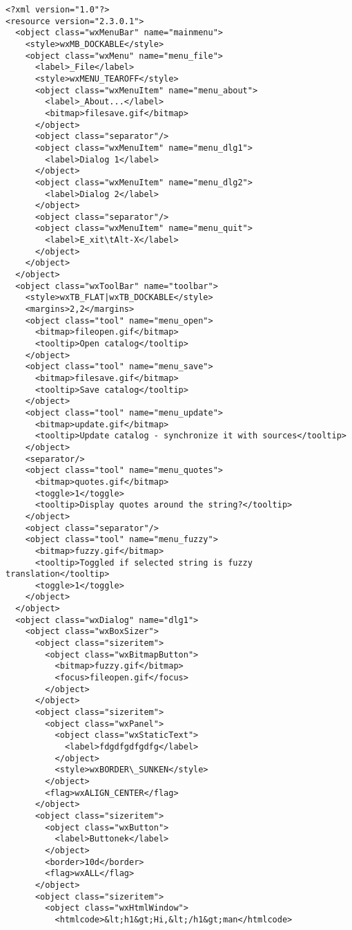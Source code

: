 \begin{verbatim}
<?xml version="1.0"?>
<resource version="2.3.0.1">
  <object class="wxMenuBar" name="mainmenu">
    <style>wxMB_DOCKABLE</style>
    <object class="wxMenu" name="menu_file">
      <label>_File</label>
      <style>wxMENU_TEAROFF</style>
      <object class="wxMenuItem" name="menu_about">
        <label>_About...</label>
        <bitmap>filesave.gif</bitmap>
      </object>
      <object class="separator"/>
      <object class="wxMenuItem" name="menu_dlg1">
        <label>Dialog 1</label>
      </object>
      <object class="wxMenuItem" name="menu_dlg2">
        <label>Dialog 2</label>
      </object>
      <object class="separator"/>
      <object class="wxMenuItem" name="menu_quit">
        <label>E_xit\tAlt-X</label>
      </object>
    </object>
  </object>
  <object class="wxToolBar" name="toolbar">
    <style>wxTB_FLAT|wxTB_DOCKABLE</style>
    <margins>2,2</margins>
    <object class="tool" name="menu_open">
      <bitmap>fileopen.gif</bitmap>
      <tooltip>Open catalog</tooltip>
    </object>
    <object class="tool" name="menu_save">
      <bitmap>filesave.gif</bitmap>
      <tooltip>Save catalog</tooltip>
    </object>
    <object class="tool" name="menu_update">
      <bitmap>update.gif</bitmap>
      <tooltip>Update catalog - synchronize it with sources</tooltip>
    </object>
    <separator/>
    <object class="tool" name="menu_quotes">
      <bitmap>quotes.gif</bitmap>
      <toggle>1</toggle>
      <tooltip>Display quotes around the string?</tooltip>
    </object>
    <object class="separator"/>
    <object class="tool" name="menu_fuzzy">
      <bitmap>fuzzy.gif</bitmap>
      <tooltip>Toggled if selected string is fuzzy translation</tooltip>
      <toggle>1</toggle>
    </object>
  </object>
  <object class="wxDialog" name="dlg1">
    <object class="wxBoxSizer">
      <object class="sizeritem">
        <object class="wxBitmapButton">
          <bitmap>fuzzy.gif</bitmap>
          <focus>fileopen.gif</focus>
        </object>
      </object>
      <object class="sizeritem">
        <object class="wxPanel">
          <object class="wxStaticText">
            <label>fdgdfgdfgdfg</label>
          </object>
          <style>wxBORDER\_SUNKEN</style>
        </object>
        <flag>wxALIGN_CENTER</flag>
      </object>
      <object class="sizeritem">
        <object class="wxButton">
          <label>Buttonek</label>
        </object>
        <border>10d</border>
        <flag>wxALL</flag>
      </object>
      <object class="sizeritem">
        <object class="wxHtmlWindow">
          <htmlcode>&lt;h1&gt;Hi,&lt;/h1&gt;man</htmlcode>

\end{verbatim}
